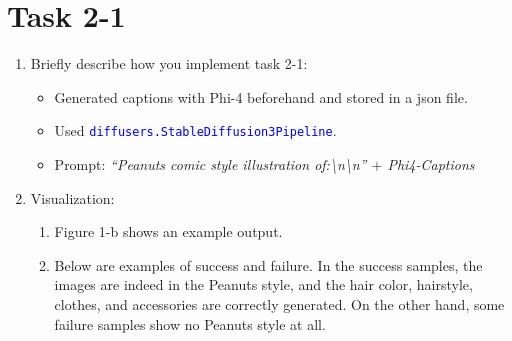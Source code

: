 \documentclass{article}
\begin{document}
\section*{Task 2-1}
\begin{enumerate}
	\item Briefly describe how you implement task 2-1:
		\begin{itemize}
			\item Generated captions with Phi-4 beforehand and stored in a json file.
			\item Used \textcolor{blue}{\texttt{diffusers.StableDiffusion3Pipeline}}.
			\item Prompt: \textit{``Peanuts comic style illustration of:\textbackslash n\textbackslash n'' $+$ Phi4-Captions}
		\end{itemize}
	\item Visualization:
		\begin{enumerate}
			\item Figure 1-b shows an example output.
			\item Below are examples of success and failure. In the success samples, the images are indeed in the Peanuts style, and the hair color, hairstyle, clothes, and accessories are correctly generated. On the other hand, some failure samples show no Peanuts style at all.
				\begin{figure}[h!]
					\centering
					\begin{minipage}{0.8\textwidth}
						\centering


\end{minipage}
\end{figure}
\end{enumerate}
\end{enumerate}
\end{document}
